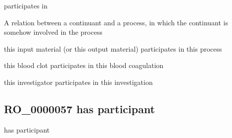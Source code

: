 \documentclass[letterpaper,10pt,english]{sphinxmanual}
\begin{document}
\begin{sphinxShadowBox}

\sphinxAtStartPar
participates in
\end{sphinxShadowBox}

\begin{sphinxShadowBox}

\sphinxAtStartPar
{}
\end{sphinxShadowBox}

\begin{sphinxShadowBox}

\sphinxAtStartPar
A relation between a continuant and a process, in which the continuant is somehow involved in the process
\end{sphinxShadowBox}

\begin{sphinxShadowBox}

\sphinxAtStartPar
this input material (or this output material) participates in this process

\sphinxAtStartPar
this blood clot participates in this blood coagulation

\sphinxAtStartPar
this investigator participates in this investigation
\end{sphinxShadowBox}

\begin{sphinxShadowBox}

\sphinxAtStartPar
{}
\end{sphinxShadowBox}
\begin{quote}

\ignorespaces \end{quote}


\subsection{RO\_0000057 \sphinxhyphen{} has participant}
\label{\detokenize{doc-RO_0000057:ro-0000057-has-participant}}\label{\detokenize{doc-RO_0000057:index-0}}\label{\detokenize{doc-RO_0000057::doc}}
\begin{sphinxShadowBox}

\sphinxAtStartPar
has participant
\end{sphinxShadowBox}
\end{document}
